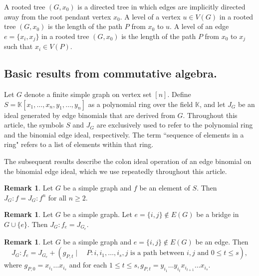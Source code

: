 \documentclass[11pt,a4paper,reqno]{amsart}
\theoremstyle{definition}
\newtheorem{remark}[theorem]{Remark}
\begin{document}
A rooted tree $(G,x_0)$ is a directed tree in which edges are implicitly directed away from the root pendant vertex $x_0$. A level of a vertex $u \in V(G)$ in a rooted tree $(G,x_0)$ is the length of the path $P$ from $x_0$ to $u$. A level of an edge $e=\{x_i,x_j\}$ in a rooted tree $(G,x_0)$ is the length of the path $P$ from $x_0$ to $x_j$ such that $x_i \in V(P)$.

\subsection{Basic results from commutative algebra.} 


Let $G$ denote a finite simple graph on vertex set $[n]$. Define $S=\mathbb{K}[x_1,\ldots,x_n,y_1,\ldots,y_n]$ as a polynomial ring over the field $\mathbb{K}$, and let $J_G$ be an ideal generated by edge binomials that are derived from $G$. Throughout this article, the symbols $S$ and $J_G$ are exclusively used to refer to the polynomial ring and the binomial edge ideal, respectively. The term ``sequence of elements in a ring" refers to a list of elements within that ring.

\vspace{2mm}

The subsequent results describe the colon ideal operation of an edge binomial on the binomial edge ideal, which we use repeatedly throughout this article.

\begin{remark}\cite[Lemma 4.1]{JAR2021} \cite[Corollary 2.2]{HH} \label{rem.colonp} Let $G$ be a simple graph and $f$ be an element of $S$. Then $J_G:f=J_G:f^n$ for all $n \geq 2$.
\end{remark} 

\begin{remark}\label{Rem.MCI} 
\cite[Theorem 3.4]{MS} Let $G$ be a simple graph. Let $e=\{i,j\} \notin E(G)$ be a bridge in $G \cup \{e\}$. Then $J_G: f_e = J_{G_e}$. 
\end{remark}

\begin{remark}\label{Rem.MCIunicy} \cite[Theorem 3.7]{MS}
Let $G$ be a simple graph and $e =\{i,j\} \notin E(G)$ be an edge. Then 
\[
J_G : f_e = J_{G_e} + (g_{P,t} \mid \quad P:i,i_1,\ldots,i_s,j \text{ is a path between } i,j \text{ and } 0 \leq t \leq s),
\] 
where $g_{P,0}=x_{i_1}\ldots x_{i_s}$ and for each $1\leq t \leq s, g_{P,t}=y_{i_1}\ldots y_{i_t}x_{i_{t+1}}\ldots x_{i_s}$.
\end{remark}
\end{document}
